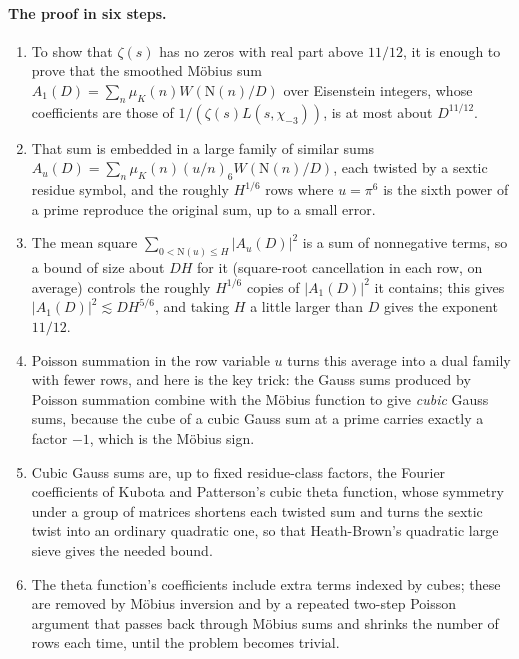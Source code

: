 \documentclass[11pt]{article}
\newcommand{\N}{\mathrm N}
\newcommand{\muk}{\mu_K}
\numberwithin{equation}{section}
\begin{document}
\paragraph{The proof in six steps.}
\begin{enumerate}
\item To show that $\zeta(s)$ has no zeros with real part above $11/12$, it
 is enough to prove that the smoothed M\"obius sum
 $A_1(D)=\sum_n\muk(n)W(\N(n)/D)$ over Eisenstein integers, whose
 coefficients are those of $1/(\zeta(s)L(s,\chi_{-3}))$, is at most about
 $D^{11/12}$.
\item That sum is embedded in a large family of similar sums
 $A_u(D)=\sum_n\muk(n)(u/n)_6W(\N(n)/D)$, each twisted by a sextic residue
 symbol, and the roughly $H^{1/6}$ rows where $u=\pi^6$ is the sixth power
 of a prime reproduce the original sum, up to a small error.
\item The mean square $\sum_{0<\N(u)\le H}|A_u(D)|^2$ is a sum of
 nonnegative terms, so a bound of size about $DH$ for it (square-root
 cancellation in each row, on average) controls the roughly $H^{1/6}$
 copies of $|A_1(D)|^2$ it contains; this gives
 $|A_1(D)|^2\lesssim DH^{5/6}$, and taking $H$ a little larger than $D$
 gives the exponent $11/12$.
\item Poisson summation in the row variable $u$ turns this average into a
 dual family with fewer rows, and here is the key trick: the Gauss sums
 produced by Poisson summation combine with the M\"obius function to give
 \emph{cubic} Gauss sums, because the cube of a cubic Gauss sum at a prime
 carries exactly a factor $-1$, which is the M\"obius sign.
\item Cubic Gauss sums are, up to fixed residue-class factors, the Fourier
 coefficients of Kubota and Patterson's cubic theta function, whose
 symmetry under a group of matrices shortens each twisted sum and turns
 the sextic twist into an ordinary quadratic one, so that Heath-Brown's
 quadratic large sieve gives the needed bound.
\item The theta function's coefficients include extra terms indexed by
 cubes; these are removed by M\"obius inversion and by a repeated two-step
 Poisson argument that passes back through M\"obius sums and shrinks the
 number of rows each time, until the problem becomes trivial.
\end{enumerate}
\end{document}
